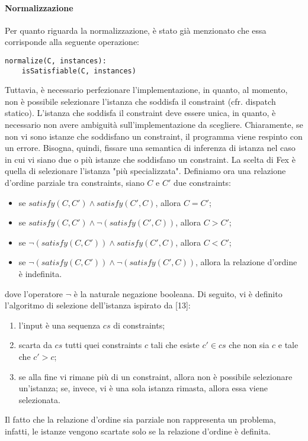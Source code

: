 \documentclass[10pt,a4paper]{article}
\begin{document}
\paragraph{Normalizzazione}
Per quanto riguarda la normalizzazione, è stato già menzionato che essa corrisponde alla seguente operazione:
\begin{lstlisting}
normalize(C, instances):
    isSatisfiable(C, instances)
\end{lstlisting}
Tuttavia, è necessario perfezionare l'implementazione, in quanto, al momento, non è possibile selezionare l'istanza
che soddisfa il constraint (cfr. dispatch statico). L'istanza che soddisfa il constraint deve essere unica,
in quanto, è necessario non avere ambiguità sull'implementazione da scegliere. Chiaramente, se non vi sono istanze
che soddisfano un constraint, il programma viene respinto con un errore. Bisogna, quindi, fissare una semantica
di inferenza di istanza nel caso in cui vi siano due o più istanze che soddisfano un constraint. La scelta di Fex è
quella di selezionare l'istanza "più specializzata". Definiamo ora una relazione d'ordine parziale tra constraints,
siano $ C $ e $ C' $ due constraints:
\begin{itemize}
    \item se $ satisfy(C, C') \wedge satisfy(C', C) $, allora $ C = C' $;
    \item se $ satisfy(C, C') \wedge \neg(satisfy(C', C)) $, allora $ C > C' $;
    \item se $ \neg(satisfy(C, C')) \wedge satisfy(C', C) $, allora $ C < C' $;
    \item se $ \neg(satisfy(C, C')) \wedge \neg(satisfy(C', C)) $, allora la relazione d'ordine è indefinita.
\end{itemize}
dove l'operatore $ \neg $ è la naturale negazione booleana. Di seguito, vi è definito l'algoritmo di selezione dell'istanza
ispirato da [13]:
\begin{enumerate}
    \item l'input è una sequenza $ cs $ di constraints;
    \item scarta da $ cs $ tutti quei constraints $ c $ tali che esiste $ c' \in cs $ che non sia $ c $ e tale che
    $ c' > c $;
    \item se alla fine vi rimane più di un constraint, allora non è possibile selezionare un'istanza; se, invece, vi
    è una sola istanza rimasta, allora essa viene selezionata.
\end{enumerate}
Il fatto che la relazione d'ordine sia parziale non rappresenta un problema, infatti, le istanze vengono scartate solo
se la relazione d'ordine è definita.
\end{document}
